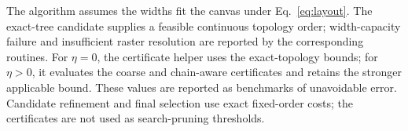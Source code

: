 \documentclass[10pt]{article}
\begin{document}
The algorithm assumes the widths fit the canvas under Eq.~\ref{eq:layout}. The exact-tree candidate supplies a feasible continuous topology order; width-capacity failure and insufficient raster resolution are reported by the corresponding routines. For $\eta=0$, the certificate helper uses the exact-topology bounds; for $\eta>0$, it evaluates the coarse and chain-aware certificates and retains the stronger applicable bound. These values are reported as benchmarks of unavoidable error. Candidate refinement and final selection use exact fixed-order costs; the certificates are not used as search-pruning thresholds.


\begin{algorithm}[htbp]
\caption{Width-Aware Refinement of One Candidate Structure}\label{alg:refine}
\end{algorithm}
\end{document}

